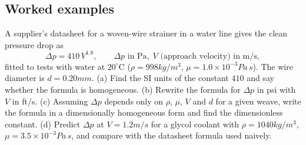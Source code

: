 \subsection*{Worked examples}

\begin{example}
A supplier's datasheet for a woven-wire strainer in a water line gives the clean pressure drop as
\[
\Delta p = 410\, V^{1.8}, \qquad \Delta p \text{ in Pa}, \; V \text{ (approach velocity) in m/s},
\]
fitted to tests with water at $20^\circ$C ($\rho = 998\unit{kg/m^3}$, $\mu = 1.0\times10^{-3}\unit{Pa\,s}$). The wire diameter is $d = 0.20\unit{mm}$.
(a) Find the SI units of the constant $410$ and say whether the formula is homogeneous.
(b) Rewrite the formula for $\Delta p$ in psi with $V$ in ft/s.
(c) Assuming $\Delta p$ depends only on $\rho$, $\mu$, $V$ and $d$ for a given weave, write the formula in a dimensionally homogeneous form and find the dimensionless constant.
(d) Predict $\Delta p$ at $V = 1.2\unit{m/s}$ for a glycol coolant with $\rho = 1040\unit{kg/m^3}$, $\mu = 3.5\times10^{-3}\unit{Pa\,s}$, and compare with the datasheet formula used naively.
\end{example}

